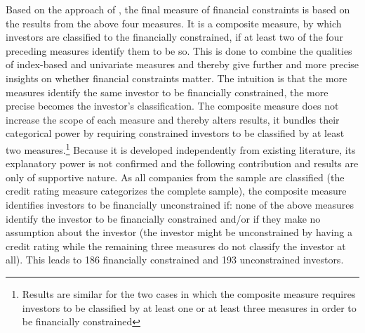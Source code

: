 \documentclass[12pt]{article}
\begin{document}
Based on the approach of \citet[p.1188]{Campello2006}, the final measure of financial constraints is based on the results from the above four measures. It is a composite measure, by which investors are classified to the financially constrained, if at least two of the four preceding measures identify them to be so. This is done to combine the qualities of index-based and univariate measures and thereby give further and more precise insights on whether financial constraints matter. The intuition is that the more measures identify the same investor to be financially constrained, the more precise becomes the investor's classification. The composite measure does not increase the scope of each measure and thereby alters results, it bundles their categorical power by requiring constrained investors to be classified by at least two measures.\footnote{Results are similar for the two cases in which the composite measure requires investors to be classified by at least one or at least three measures in order to be financially constrained} Because it is developed independently from existing literature, its explanatory power is not confirmed and the following contribution and results are only of supportive nature.
As all companies from the sample are classified (the credit rating measure categorizes the complete sample), the composite measure identifies investors to be financially unconstrained if: none of the above measures identify the investor to be financially constrained and/or if they make no assumption about the investor (the investor might be unconstrained by having a credit rating while the remaining three measures do not classify the investor at all). This leads to 186 financially constrained and 193 unconstrained investors.\par
\end{document}

